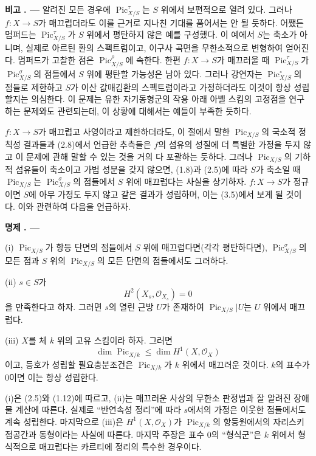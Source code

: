 \documentclass[11pt,twoside,openany]{book}
\numberwithin{equation}{section}
\newcommand{\sourceunit}{front}
\newcommand{\src}[1]{%
  \phantomsection\hypertarget{src:\sourceunit:#1}{}%
  \marginpar{\raggedleft\footnotesize\sffamily #1}%
}
\theoremstyle{plain}
\theoremstyle{definition}
\theoremstyle{remark}
\newcommand{\result}[2]{%
  \par\medskip\noindent\textbf{#1%
  \if\relax\detokenize{#2}\relax\else\space#2\fi. ---}\enspace
}
\begin{document}
\result{비고}{2.9} 알려진 모든 경우에
$\operatorname{Pic}_{X/S}^\tau$는 $S$ 위에서 보편적으로 열려 있다. 그러나
$f:X\longrightarrow S$가 매끄럽더라도 이를 근거로 지나친 기대를 품어서는
안 될 듯하다. 어쨌든 멈퍼드는 $\operatorname{Pic}_{X/S}^\tau$가 $S$
위에서 평탄하지 않은 예를 구성했다. 이 예에서 $S$는 축소가 아니며, 실제로
아르틴 환의 스펙트럼이고, 이구사 곡면을 무한소적으로 변형하여 얻어진다.
멈퍼드가 고찰한 점은 $\operatorname{Pic}_{X/S}^\rho$에 속한다. 한편
$f:X\longrightarrow S$가 매끄러울 때 $\operatorname{Pic}_{X/S}^\tau$가
$\operatorname{Pic}_{X/S}^\sigma$의 점들에서 $S$ 위에 평탄할 가능성은
남아 있다. 그러나 강연자는 $\operatorname{Pic}_{X/S}^\circ$의 점들로
제한하고 $S$가 이산 값매김환의 스펙트럼이라고 가정하더라도 이것이 항상
성립할지는 의심한다. 이 문제는 유한 자기동형군의 작용 아래 아벨 스킴의
고정점을 연구하는 문제와도 관련되는데, 이 상황에 대해서는 예들이 부족한
듯하다.

$f:X\longrightarrow S$가 매끄럽고 사영이라고 제한하더라도, 이 절에서 말한
$\operatorname{Pic}_{X/S}$의 국소적 정칙성 결과들과 (2.8)에서 언급한
추측들은 $f$의 섬유의 성질에 더 특별한 가정을 두지 않고 이 문제에 관해 말할
수 있는 것을 거의 다 포괄하는 듯하다. 그러나
$\operatorname{Pic}_{X/S}$의 기하적 섬유들이 축소이고 가법 성분을 갖지
않으면, (1.8)과 (2.5)에 따라 $S$가 축소일 때
$\operatorname{Pic}_{X/S}$는 $\operatorname{Pic}_{X/S}^\sigma$의 점들에서
$S$ 위에 매끄럽다는 사실을 상기하자. $f:X\longrightarrow S$가 정규이면
$S$에 아무 가정도 두지 않고 같은 결과가 성립하며, 이는 (3.5)에서 보게 될
것이다. 이와 관련하여 다음을 언급하자.

\result{명제}{2.10}

\noindent(i) $\operatorname{Pic}_{X/S}$가 항등 단면의 점들에서 $S$ 위에
매끄럽다면(각각 평탄하다면), $\operatorname{Pic}_{X/S}^\sigma$의 모든
점과 $S$ 위의 $\operatorname{Pic}_{X/S}$의 모든 단면의 점들에서도 그러하다.

\src{236}
\noindent(ii) $s\in S$가
\[
H^2(X_s,\mathcal O_{X_s})=0
\]
을 만족한다고 하자. 그러면 $s$의 열린 근방 $U$가 존재하여
$\operatorname{Pic}_{X/S}|U$는 $U$ 위에서 매끄럽다.

\noindent(iii) $X$를 체 $k$ 위의 고유 스킴이라 하자. 그러면
\[
\dim\operatorname{Pic}_{X/k}\leq\dim H^1(X,\mathcal O_X)
\]
이고, 등호가 성립할 필요충분조건은 $\operatorname{Pic}_{X/k}$가 $k$ 위에서
매끄러운 것이다. $k$의 표수가 0이면 이는 항상 성립한다.

(i)은 (2.5)와 (1.12)에 따르고, (ii)는 매끄러운 사상의 무한소 판정법과 잘
알려진 장애물 계산에 따른다. 실제로 ``반연속성 정리''에 따라 $s$에서의
가정은 이웃한 점들에서도 계속 성립한다. 마지막으로 (iii)은
$H^1(X,\mathcal O_X)$가 $\operatorname{Pic}_{X/k}$의 항등원에서의 자리스키
접공간과 동형이라는 사실에 따른다. 마지막 주장은 표수 0의 ``형식군''은
$k$ 위에서 형식적으로 매끄럽다는 카르티에 정리의 특수한 경우이다.
\end{document}
